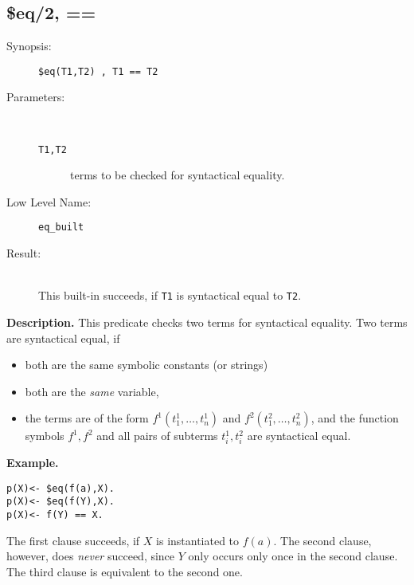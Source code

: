 %
%
%
\subsection{\$eq/2, ==}

\begin{description}
\item[Synopsis:]
	{\tt \$eq(T1,T2) , T1 == T2 }
\item[Parameters:]\ \\[-0.5cm]
	\begin{description}
	\item[{\tt T1,T2}]
terms to be checked for syntactical equality.
	\end{description}
\item[Low Level Name:]
	{\tt eq\_built}
\item[Result:]\ \\
This built-in succeeds, if {\tt T1} is syntactical equal to
{\tt T2}.
\end{description}

\vspace*{0.5cm}
\noindent
{\bf Description.}
This predicate checks two terms for syntactical equality.
Two terms are syntactical equal, if
\begin{itemize}
\item
both are the same symbolic constants (or strings)
\item
both are the {\em same\/} variable,
\item
the terms are of the form
$f^1(t_1^1,\ldots,t_n^1)$ and
$f^2(t_1^2,\ldots,t_n^2)$, and the function symbols $f^1,f^2$ and all
pairs of subterms $t^1_i,t^2_i$ are syntactical equal.
\end{itemize}

\vspace*{0.5cm}
\noindent
{\bf Example.}
\begin{verbatim}
p(X)<- $eq(f(a),X).
p(X)<- $eq(f(Y),X).
p(X)<- f(Y) == X.
\end{verbatim}
The first clause succeeds, if $X$ is instantiated to $f(a)$.
The second clause, however, does {\em never\/} succeed, since
$Y$ only occurs only once in the second clause.
The third clause is equivalent to the second one.
 
